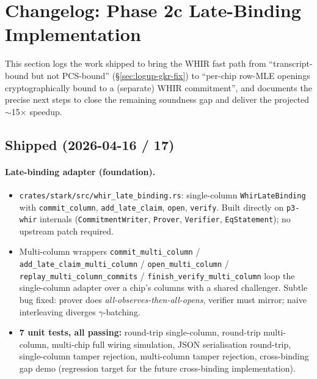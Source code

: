 \section{Changelog: Phase 2c Late-Binding Implementation}
\label{sec:changelog-phase2c}

This section logs the work shipped to bring the WHIR fast path from
``transcript-bound but not PCS-bound''
(\S\ref{sec:logup-gkr-fix}) to ``per-chip row-MLE openings
cryptographically bound to a (separate) WHIR commitment'', and
documents the precise next steps to close the remaining soundness gap
and deliver the projected $\sim$15$\times$ speedup.

\subsection{Shipped (2026-04-16 / 17)}

\paragraph{Late-binding adapter (foundation).}
\begin{itemize}
  \item \texttt{crates/stark/src/whir\_late\_binding.rs}: single-column
        \texttt{WhirLateBinding} with \texttt{commit\_column},
        \texttt{add\_late\_claim}, \texttt{open}, \texttt{verify}.
        Built directly on \texttt{p3-whir} internals
        (\texttt{CommitmentWriter}, \texttt{Prover}, \texttt{Verifier},
        \texttt{EqStatement}); no upstream patch required.
  \item Multi-column wrappers \texttt{commit\_multi\_column} /
        \texttt{add\_late\_claim\_multi\_column} /
        \texttt{open\_multi\_column} /
        \texttt{replay\_multi\_column\_commits} /
        \texttt{finish\_verify\_multi\_column} loop the single-column
        adapter over a chip's columns with a shared challenger.
        Subtle bug fixed: prover does
        \emph{all-observes-then-all-opens}, verifier must mirror;
        naive interleaving diverges $\gamma$-batching.
  \item \textbf{7 unit tests, all passing:}
        round-trip single-column, round-trip multi-column,
        multi-chip full wiring simulation, JSON serialisation
        round-trip, single-column tamper rejection, multi-column
        tamper rejection, cross-binding gap demo (regression target
        for the future cross-binding implementation).
\end{itemize}

